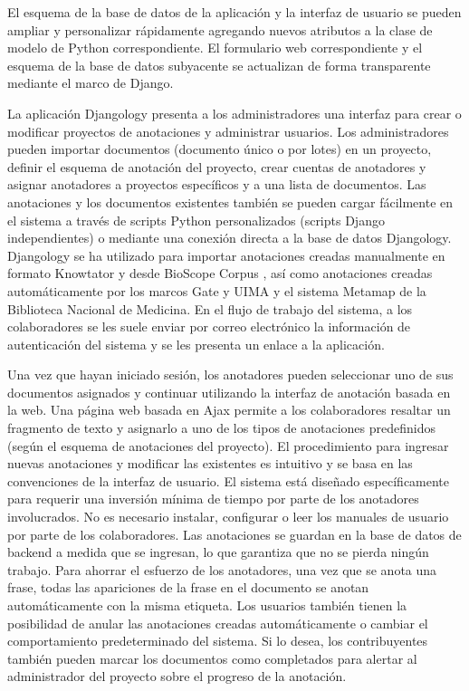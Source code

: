 El esquema de la base de datos de la aplicación y la interfaz de usuario se pueden ampliar y personalizar rápidamente agregando nuevos atributos a la clase de modelo de Python correspondiente. El formulario web correspondiente y el esquema de la base de datos subyacente se actualizan de forma transparente mediante el marco de Django.

La aplicación Djangology presenta a los administradores una interfaz para crear o modificar proyectos de anotaciones y administrar usuarios.
Los administradores pueden importar documentos (documento único o por lotes) en un proyecto, definir el esquema de anotación del proyecto, crear cuentas de anotadores y asignar anotadores a proyectos específicos y a una lista de documentos.
Las anotaciones y los documentos existentes también se pueden cargar fácilmente en el sistema a través de scripts Python personalizados (scripts Django independientes) o mediante una conexión directa a la base de datos Djangology.
Djangology se ha utilizado para importar anotaciones creadas manualmente en formato Knowtator y desde BioScope Corpus \cite{Szarvas2008}, así como anotaciones creadas automáticamente por los marcos Gate y UIMA \cite{Ferrucci2004} y el sistema Metamap de la Biblioteca Nacional de Medicina.
En el flujo de trabajo del sistema, a los colaboradores se les suele enviar por correo electrónico la información de autenticación del sistema y se les presenta un enlace a la aplicación.

Una vez que hayan iniciado sesión, los anotadores pueden seleccionar uno de sus documentos asignados y continuar utilizando la interfaz de anotación basada en la web.
Una página web basada en Ajax permite a los colaboradores resaltar un fragmento de texto y asignarlo a uno de los tipos de anotaciones predefinidos (según el esquema de anotaciones del proyecto).
El procedimiento para ingresar nuevas anotaciones y modificar las existentes es intuitivo y se basa en las convenciones de la interfaz de usuario.
El sistema está diseñado específicamente para requerir una inversión mínima de tiempo por parte de los anotadores involucrados.
No es necesario instalar, configurar o leer los manuales de usuario por parte de los colaboradores.
Las anotaciones se guardan en la base de datos de backend a medida que se ingresan, lo que garantiza que no se pierda ningún trabajo.
Para ahorrar el esfuerzo de los anotadores, una vez que se anota una frase, todas las apariciones de la frase en el documento se anotan automáticamente con la misma etiqueta.
Los usuarios también tienen la posibilidad de anular las anotaciones creadas automáticamente o cambiar el comportamiento predeterminado del sistema.
Si lo desea, los contribuyentes también pueden marcar los documentos como completados para alertar al administrador del proyecto sobre el progreso de la anotación.

